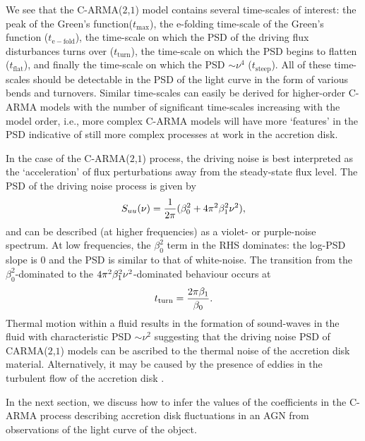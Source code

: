 \documentclass[a4paper,fleqn,usenatbib]{mnras}
\begin{document}
We see that the C-ARMA($2$,$1$) model contains several time-scales of interest: the peak of the Green's function($t_{\mathrm{max}}$), the e-folding time-scale of the Green's function ($t_{\mathrm{e-fold}}$), the time-scale on which the PSD of the driving flux disturbances turns over ($t_{\mathrm{turn}}$), the time-scale on which the PSD begins to flatten ($t_{\mathrm{flat}}$), and finally the time-scale on which the PSD $\sim \nu^{4}$ ($t_{\mathrm{steep}}$). All of these time-scales should be detectable in the PSD of the light curve in the form of various bends and turnovers. Similar time-scales can easily be derived for higher-order C-ARMA models with the number of significant time-scales increasing with the model order, i.e., more complex C-ARMA models will have more `features' in the PSD indicative of still more complex processes at work in the accretion disk.

In the case of the C-ARMA($2$,$1$) process, the driving noise is best interpreted as the `acceleration' of flux perturbations away from the steady-state flux level. The PSD of the driving noise process is given by
\begin{equation}\label{eq:CARMA21distPSD}
S_{uu}(\nu) = \frac{1}{2 \pi}(\beta_{0}^{2} + 4 \pi^{2} \beta_{1}^{2} \nu^{2}),
\end{equation}
and can be described (at higher frequencies) as a violet- or purple-noise spectrum. At low frequencies, the $\beta_{0}^{2}$ term in the RHS dominates: the log-PSD slope is $0$ and the PSD is similar to that of white-noise. The transition from the $\beta_{0}^{2}$-dominated to the $4 \pi^{2} \beta_{1}^{2} \nu^{2}$-dominated behaviour occurs at
\begin{equation}\label{eq:distPSDTurnover}
t_{\mathrm{turn}} = \frac{2 \pi \beta_{1}}{\beta_{0}}.
\end{equation}
Thermal motion within a fluid results in the formation of sound-waves in the fluid with characteristic PSD $\sim \nu^{{2}}$ \citep{Mellen52} suggesting that the driving noise PSD of CARMA($2$,$1$) models can be ascribed to the thermal noise of the accretion disk material. Alternatively, it may be caused by the presence of eddies in the turbulent flow of the accretion disk \citep{EddySim15}.

In the next section, we discuss how to infer the values of the coefficients in the C-ARMA process describing accretion disk fluctuations in an AGN from observations of the light curve of the object.

\end{document}

